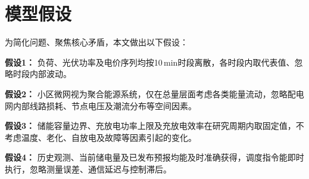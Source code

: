 \section{模型假设}

为简化问题、聚焦核心矛盾，本文做出以下假设：

\textbf{假设1：} 负荷、光伏功率及电价序列均按10\,min时段离散，各时段内取代表值、忽略时段内部波动。

\textbf{假设2：} 小区微网视为聚合能源系统，仅在总量层面考虑各类能量流动，忽略配电网内部线路损耗、节点电压及潮流分布等空间因素。

\textbf{假设3：} 储能容量边界、充放电功率上限及充放电效率在研究周期内取固定值，不考虑温度、老化、自放电及故障等因素引起的变化。

\textbf{假设4：} 历史观测、当前储电量及已发布预报均能及时准确获得，调度指令能即时执行，忽略测量误差、通信延迟与控制滞后。